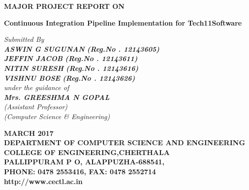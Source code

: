 \documentclass[12pt,a4paper,oneside]{report}
\begin{document}
\renewcommand\bibname{References}
\begin{titlepage}
\begin{center}
\Large{\textbf{MAJOR PROJECT REPORT ON}}\\
\vspace{.2 in}
\begin{singlespace}
\LARGE{\textbf{Continuous Integration Pipeline Implementation for Tech11Software }}\\
\end{singlespace}
\vspace{.2 in}
\Large{\textit{Submitted By }}\\
\Large{\textit{\textbf{ASWIN G SUGUNAN }\textbf{(Reg.No . 12143605)}}} \\
\Large{\textit{\textbf{JEFFIN JACOB  }\textbf{(Reg.No . 12143611)}}} \\
\Large{\textit{\textbf{NITIN SURESH }\textbf{(Reg.No . 12143616)}}} \\
\Large{\textit{\textbf{VISHNU BOSE }\textbf{(Reg.No . 12143626)}}} \\
\Large{\textit{\textit{under the guidance of}}}\\
\Large{\textit{\textbf{Mrs. GREESHMA N GOPAL}}}\\
\Large{\textit{(Assistant Professor)}}\\
\Large{\textit{(Computer Science \& Engineering)}}
\vspace{.05in}
\begin{figure}[h]
\begin{center}
\end{center}
\end{figure}
\begin{singlespace}
\large{\textbf{MARCH 2017}}\\
\vspace{.1in}
\large{\textbf{DEPARTMENT OF COMPUTER SCIENCE AND ENGINEERING\\COLLEGE OF ENGINEERING,CHERTHALA\\ PALLIPPURAM P O, ALAPPUZHA-688541, \\PHONE: 0478 2553416, FAX: 0478 2552714\\http://www.cectl.ac.in}}
\end{singlespace}
\end{center}
\end{titlepage}
\end{document}
